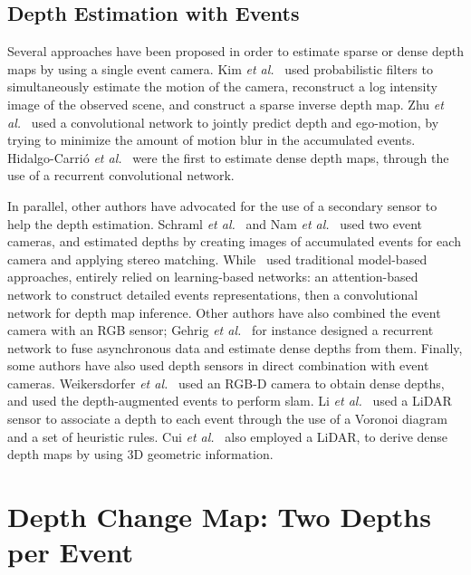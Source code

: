 \subsection{Depth Estimation with Events}
Several approaches have been proposed in order to estimate sparse or dense depth maps by using a single event camera. Kim \textit{et al.}~\cite{Kim2016RealTime3R} used probabilistic filters to simultaneously estimate the motion of the camera, reconstruct a log intensity image of the observed scene, and construct a sparse inverse depth map. Zhu \textit{et al.}~\cite{Zhu2019UnsupervisedEL} used a convolutional network to jointly predict depth and ego-motion, by trying to minimize the amount of motion blur in the accumulated events. Hidalgo-Carri\'o \textit{et al.}~\cite{HidalgoCarrio2020LearningMD} were the first to estimate dense depth maps, through the use of a recurrent convolutional network.

In parallel, other authors have advocated for the use of a secondary sensor to help the depth estimation. Schraml \textit{et al.}~\cite{Schraml2010DynamicSV,Schraml2016AnES} and Nam \textit{et al.}~\cite{Nam2022StereoDF} used two event cameras, and estimated depths by creating images of accumulated events for each camera and applying stereo matching. While~\cite{Schraml2010DynamicSV,Schraml2016AnES} used traditional model-based approaches, \cite{Nam2022StereoDF} entirely relied on learning-based networks: an attention-based network to construct detailed events representations, then a convolutional network for depth map inference. Other authors have also combined the event camera with an RGB sensor; Gehrig \textit{et al.}~\cite{Gehrig2021CombiningEA} for instance designed a recurrent network to fuse asynchronous data and estimate dense depths from them. Finally, some authors have also used depth sensors in direct combination with event cameras. Weikersdorfer \textit{et al.}~\cite{Weikersdorfer2014Eventbased3S} used an \mbox{RGB-D} camera to obtain dense depths, and used the depth-augmented events to perform \acrshort{slam}. Li \textit{et al.}~\cite{Li2021Enhancing3L} used a LiDAR sensor to associate a depth to each event through the use of a Voronoi diagram and a set of heuristic rules. Cui \textit{et al.}~\cite{Cui2022DenseDE} also employed a LiDAR, to derive dense depth maps by using 3D geometric information.


\section{Depth Change Map: Two Depths per Event}\label{sec:aled:two_depths_per_event}

